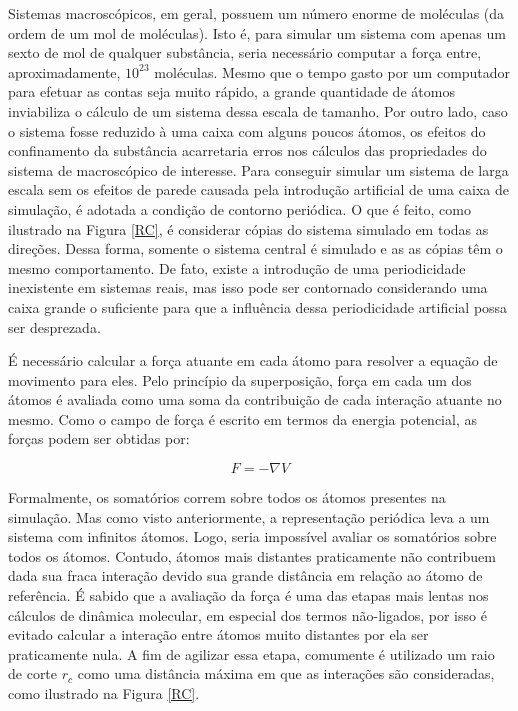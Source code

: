 Sistemas macroscópicos, em geral, possuem um número enorme de moléculas (da ordem de um mol de moléculas).
Isto é, para simular um sistema com apenas um sexto de mol de qualquer substância, seria necessário computar a força entre, aproximadamente, $10^{23}$ moléculas.
Mesmo que o tempo gasto por um computador para efetuar as contas seja muito rápido, a grande quantidade de átomos inviabiliza o cálculo de um sistema dessa escala de tamanho.
Por outro lado, caso o sistema fosse reduzido à uma caixa com alguns poucos átomos, os efeitos do confinamento da substância acarretaria erros nos cálculos das propriedades do sistema de macroscópico de interesse.
Para conseguir simular um sistema de larga escala sem os efeitos de parede causada pela introdução artificial de uma caixa de simulação, é adotada a condição de contorno periódica.
O que é feito, como ilustrado na Figura \ref{RC}, é considerar cópias do sistema simulado em todas as direções.
Dessa forma, somente o sistema central é simulado e as as cópias têm o mesmo comportamento.
De fato, existe a introdução de uma periodicidade inexistente em sistemas reais, mas isso pode ser contornado considerando uma caixa grande o suficiente para que a influência dessa periodicidade artificial possa ser desprezada.

É necessário calcular a força atuante em cada átomo para resolver a equação de movimento para eles.
Pelo princípio da superposição, força em cada um dos átomos é avaliada como uma soma da contribuição de cada interação atuante no mesmo.
Como o campo de força é escrito em termos da energia potencial, as forças podem ser obtidas por: 

\begin{equation}
F=-\nabla V
\end{equation}

Formalmente, os somatórios correm sobre todos os átomos presentes na simulação.
Mas como visto anteriormente, a representação periódica leva a um sistema com infinitos átomos.
Logo, seria impossível avaliar os somatórios sobre todos os átomos.
Contudo, átomos mais distantes praticamente não contribuem dada sua fraca interação devido sua grande distância em relação ao átomo de referência.
É sabido que a avaliação da força é uma das etapas mais lentas nos cálculos de dinâmica molecular, em especial dos termos não-ligados, por isso é evitado calcular a interação entre átomos muito distantes por ela ser praticamente nula.
A fim de agilizar essa etapa, comumente é utilizado um raio de corte $r_c$ como uma distância máxima em que as interações são consideradas\cite{Frenkel2002}, como ilustrado na Figura \ref{RC}.

